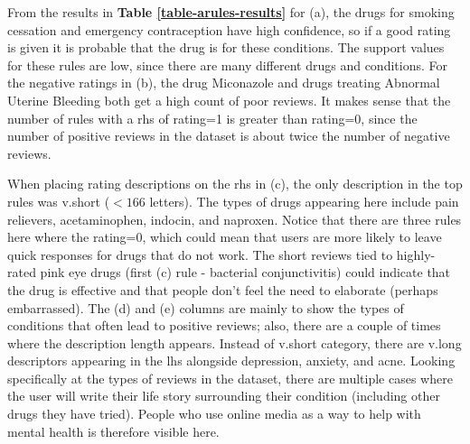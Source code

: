 \documentclass[11pt]{article}
\begin{document}
From the results in \textbf{Table \ref{table-arules-results}} for (a), the drugs for smoking cessation and emergency contraception have high confidence, so if a good rating is given it is probable that the drug is for these conditions. The support values for these rules are low, since there are many different drugs and conditions. For the negative ratings in (b), the drug Miconazole and drugs treating Abnormal Uterine Bleeding both get a high count of poor reviews. It makes sense that the number of rules with a rhs of rating=1 is greater than rating=0, since the number of positive reviews in the dataset is about twice the number of negative reviews.

When placing rating descriptions on the rhs in (c), the only description in the top rules was v.short ($<166$ letters). The types of drugs appearing here include pain relievers, acetaminophen, indocin, and naproxen. Notice that there are three rules here where the rating=0, which could mean that users are more likely to leave quick responses for drugs that do not work. The short reviews tied to highly-rated pink eye drugs (first (c) rule - bacterial conjunctivitis) could indicate that the drug is effective and that people don't feel the need to elaborate (perhaps embarrassed). The (d) and (e) columns are mainly to show the types of conditions that often lead to positive reviews; also, there are a couple of times where the description length appears. Instead of v.short category, there are v.long descriptors appearing in the lhs alongside depression, anxiety, and acne. Looking specifically at the types of reviews in the dataset, there are multiple cases where the user will write their life story surrounding their condition (including other drugs they have tried). People who use online media as a way to help with mental health is therefore visible here.
\end{document}
